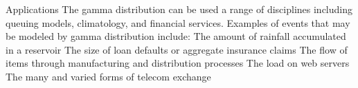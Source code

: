 Applications
The gamma distribution can be used a range of disciplines including queuing models, climatology, and financial services. Examples of events that may be modeled by gamma distribution include:
The amount of rainfall accumulated in a reservoir
The size of loan defaults or aggregate insurance claims
The flow of items through manufacturing and distribution processes
The load on web servers
The many and varied forms of telecom exchange
